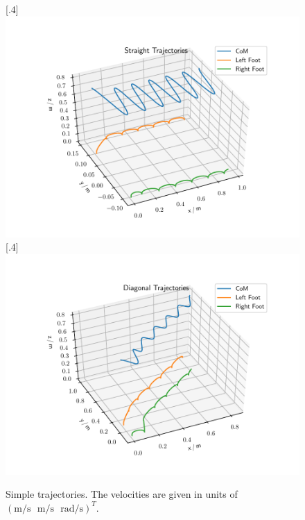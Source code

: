 \begin{figure}[h]
	\centering
	[.4\linewidth]{\includegraphics[scale=.35]{chapters/05_experiments/01_user_controlled_walking/01_benchmarking/nmpc_straight.pdf}}
	[.4\linewidth]{\includegraphics[scale=.35]{chapters/05_experiments/01_user_controlled_walking/01_benchmarking/nmpc_diagonal.pdf}}
	\caption{Simple trajectories. The velocities are given in units of\\$(\text{m}/\text{s}\,\,\,\,\text{m}/\text{s}\,\,\,\,\text{rad}/\text{s})^T$.}
	\label{fig::511_benchmarking_basic}
\end{figure} 
